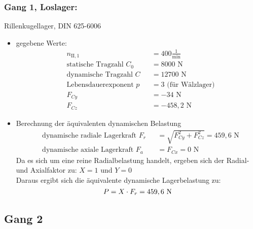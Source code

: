 \subsubsection{Gang 1, Loslager:} Rillenkugellager, DIN 625-6006\\
\begin{itemize}
	\item gegebene Werte:
	\begin{align*}
	&n_{{\mathord{\mathrm{II}},1}} &&=  400 \frac{1}{\text{min}} \\
	&\text{statische Tragzahl } C_{0} &&= 8000 \text{ N}\\
	&\text{dynamische Tragzahl } C &&= 12700 \text{ N} \\
	&\text{Lebensdauerexponent } p &&= 3 \text{ (für Wälzlager)} \\
	&F_{Cy} && = -34 \text{ N}\\
	&F_{Cz} && = -458,2 \text{ N}
	\end{align*} 
	\item Berechnung der äquivalenten dynamischen Belastung
	\begin{align*}
	&\text{dynamische radiale Lagerkraft } F_r&& = \sqrt{F_{Cy}^2 + F_{Cz}^2 } = 459,6 \text{ N} \\
	&\text{dynamische axiale Lagerkraft } F_a&& = F_{Cx} = 0\text{ N}
	\end{align*} 
	Da es sich um eine reine Radialbelastung handelt, ergeben sich der Radial- und Axialfaktor zu: $X= 1$ und $Y=0$\\
	Daraus ergibt sich die äquivalente dynamische Lagerbelastung zu:  
	\[
	P= X \cdot F_r =459,6 \text{ N}
	\]
\end{itemize}
\newpage

\subsection{Gang 2}
